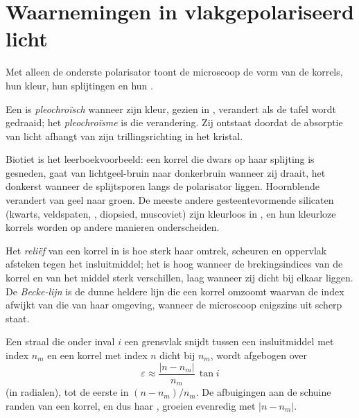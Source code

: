 \section{Waarnemingen in vlakgepolariseerd licht}

Met alleen de onderste polarisator toont de microscoop de vorm van de korrels, hun kleur, hun splijtingen en hun .

\begin{definition}[Pleochroïsme]\label{def:b1:optical-mineralogy:pleochroism}
Een  is \emph{pleochroïsch} wanneer zijn kleur, gezien in , verandert als de tafel
wordt gedraaid; het \emph{pleochroïsme} is die verandering. Zij ontstaat doordat de absorptie van licht afhangt van zijn trillingsrichting
in het kristal.
\end{definition}

Biotiet is het leerboekvoorbeeld: een korrel die dwars op haar splijting is gesneden, gaat van lichtgeel-bruin naar donkerbruin wanneer zij
draait, het donkerst wanneer de splijtsporen langs de polarisator liggen. Hoornblende verandert van geel naar groen. De meeste andere
gesteentevormende silicaten (kwarts, veldspaten, , diopsied, muscoviet) zijn kleurloos in , en hun kleurloze korrels worden
op andere manieren onderscheiden.

\begin{definition}\label{def:b1:optical-mineralogy:relief}
Het \emph{reliëf} van een korrel in  is hoe sterk haar omtrek, scheuren en oppervlak afsteken tegen het
insluitmiddel; het is hoog wanneer de brekingsindices van de korrel en van het middel sterk verschillen, laag wanneer zij dicht bij elkaar liggen.
De \emph{Becke-lijn} is de dunne heldere lijn die een korrel omzoomt waarvan de index afwijkt van die van haar omgeving, wanneer
de microscoop enigszins uit scherp staat.
\end{definition}

\begin{proposition}\label{prop:b1:optical-mineralogy:relief}
Een straal die onder inval $i$ een grensvlak snijdt tussen een insluitmiddel met index $n_m$ en een korrel met index $n$ dicht bij $n_m$, wordt
afgebogen over
\[
  \varepsilon \approx \frac{|n - n_m|}{n_m}\,\tan i
\]
(in radialen), tot de eerste  in $(n - n_m)/n_m$. De afbuigingen aan de schuine randen van een korrel, en dus haar , groeien evenredig
met $|n - n_m|$.
\end{proposition}

